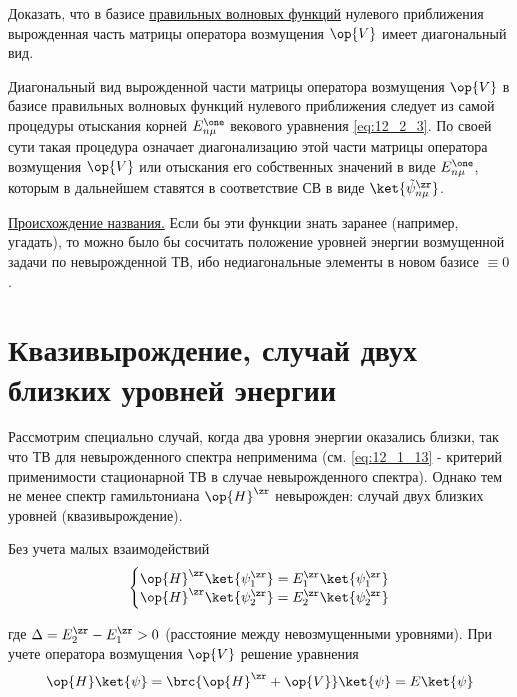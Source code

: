\begin{excr}
Доказать, что в базисе \underline{правильных волновых функций} нулевого приближения вырожденная часть матрицы оператора возмущения $\op{V}$ имеет диагональный вид.
\end{excr}

Диагональный вид вырожденной части матрицы оператора возмущения $\op{V}$ в базисе правильных волновых функций нулевого приближения следует из самой процедуры отыскания корней $E_{n \mu} ^\one$ векового уравнения \eqref{eq:12_2_3}. По своей сути такая процедура означает диагонализацию этой части матрицы оператора возмущения $\op{V}$ или отыскания его собственных значений в виде $E_{n \mu} ^\one$, которым в дальнейшем ставятся в соответствие СВ в виде $\ket{\tilde{\psi}_{n \mu}^\zr}$.

\underline{Происхождение названия.} Если бы эти функции знать заранее (например, угадать), то можно было бы сосчитать положение уровней энергии возмущенной задачи по невырожденной ТВ, ибо недиагональные элементы в новом базисе $\equiv 0$.
 
\section{Квазивырождение, случай двух близких уровней энергии}

Рассмотрим специально случай, когда два уровня энергии оказались близки, так что ТВ для невырожденного спектра неприменима (см. \eqref{eq:12_1_13} - критерий применимости стационарной ТВ в случае невырожденного спектра). Однако тем не менее спектр гамильтониана $\op{H}^\zr$ невырожден: случай двух близких уровней (квазивырождение).

Без учета малых взаимодействий
\begin{equation}
\label{eq:12_3_1}
\left \{ 
\begin{matrix}
\op{H}^\zr \ket{\psi_1^\zr} = E_1^\zr \ket{\psi_1^\zr} \\
\op{H}^\zr \ket{\psi_2^\zr} = E_2^\zr \ket{\psi_2^\zr}
\end{matrix}
\right .
\end{equation}  

где $\Delta = E_2^\zr - E_1 ^\zr > 0$ (расстояние между невозмущенными уровнями). При учете оператора возмущения $\op{V}$ решение уравнения
\begin{equation}
\label{eq:12_3_2}
\op{H} \ket{\psi} = \brc{\op{H}^\zr + \op{V}} \ket{\psi} = E \ket{\psi}
\end{equation}

